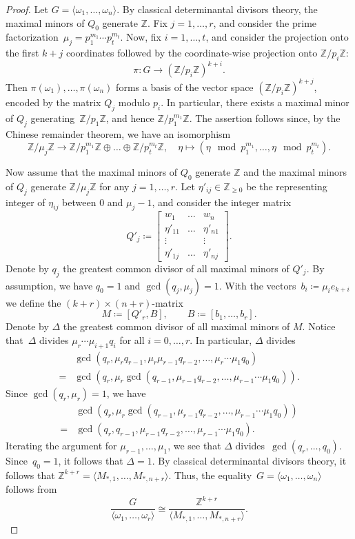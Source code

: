 \documentclass[10pt,a4paper]{amsart}
\newcommand{\Z}{\mathbb{Z}}
\begin{document}
\begin{proof}
    Let $G=\langle \omega_1,\dots,\omega_n\rangle$. By classical determinantal divisors theory, the maximal minors of $Q_0$ generate $\Z$. Fix $j=1,\dots,r$, and consider the prime factorization~$\mu_j=p_1^{m_1}\cdots p_t^{m_t}$. Now, fix $i=1,\dots,t$, and consider the projection onto the first $k+j$ coordinates followed by the coordinate-wise projection onto $\Z/p_i\Z$:
    $$
    \pi\colon G\rightarrow(\Z/p_i\Z)^{k+i}.
    $$
    Then $\pi(\omega_1),\dots,\pi(\omega_n)$ forms a basis of the vector space $(\Z/p_i\Z)^{k+j}$, encoded by the matrix $Q_j$ modulo $p_i$. In particular, there exists a maximal minor of $Q_j$ generating~$\Z/p_1\Z$, and hence $\Z/p_1^{m_1}\Z$. The assertion follows since, by the Chinese remainder theorem, we have an isomorphism
    $$
    \Z/\mu_j\Z\rightarrow\Z/{p_1^{m_1}}\Z\oplus\dots\oplus\Z/p_t^{m_t}\Z, \quad     \eta\mapsto(\eta\mod p_1^{m_1},\dots,\eta\mod p_t^{m_t}).
    $$
    
    Now assume that the maximal minors of $Q_0$ generate $\Z$ and the maximal minors of $Q_j$ generate $\Z/\mu_j\Z$ for any $j=1,\dots,r$.
    Let $\eta'_{ij}\in\Z_{\geq 0}$ be the representing integer of  $\eta_{ij}$ between $0$ and $\mu_j-1$, and consider the integer matrix
    $$
    Q'_j\coloneqq \begin{bmatrix}
        w_1 &\dots &w_n\\
        \eta'_{11} & \dots & \eta'_{n1}\\
        \vdots & & \vdots\\
        \eta'_{1j} & \dots & \eta'_{nj}
    \end{bmatrix}.
    $$
    Denote by $q_j$ the greatest common divisor of all maximal minors of $Q'_j$. By assumption, we have $q_0=1$ and $\gcd(q_j,\mu_j)=1$.
    With the vectors~$b_i\coloneqq\mu_i e_{k+i}$ we define the $(k+r)\times(n+r)$-matrix
    $$
    M\coloneqq[Q'_r,B],\qquad B\coloneqq[b_1,\dots,b_r].
    $$
    Denote by $\Delta$ the greatest common divisor of all maximal minors of $M$. Notice that~$\Delta$ divides $\mu_r\cdots\mu_{i+1}q_{i}$ for all $i=0,\dots,r$.
    In particular, $\Delta$ divides \begin{align*}
        &\gcd(q_r,\mu_r q_{r-1},\mu_r\mu_{r-1}q_{r-2},\dots,\mu_r\cdots\mu_1q_0)\\
        =&\gcd(q_r,\mu_r\gcd(q_{r-1},\mu_{r-1}q_{r-2},\dots,\mu_{r-1}\cdots\mu_1q_0)).
    \end{align*}
    Since $\gcd(q_r,\mu_r)=1$, we have
    \begin{align*}
    &\gcd(q_r,\mu_r\gcd(q_{r-1},\mu_{r-1}q_{r-2},\dots,\mu_{r-1}\cdots\mu_1q_0))\\
    =&\gcd(q_r,q_{r-1},\mu_{r-1}q_{r-2},\dots,\mu_{r-1}\cdots\mu_1q_0).
    \end{align*}
    Iterating the argument for $\mu_{r-1},\dots,\mu_1$, we see that $\Delta$ divides~$\gcd(q_r,\dots,q_0)$. Since~$q_0=1$, it follows that $\Delta=1$. By classical determinantal divisors theory, it follows that
    $\Z^{k+r}=\langle M_{*,1},\dots,M_{*,n+r}\rangle$. Thus, the equality~$G=\langle \omega_1,\dots,\omega_n\rangle$ follows from
    $$
    \dfrac{G}{\langle \omega_1,\dots,\omega_r\rangle}\cong\dfrac{\Z^{k+r}}{\langle M_{*,1},\dots,M_{*,n+r}\rangle}.
    $$
    
\end{proof}
\end{document}
